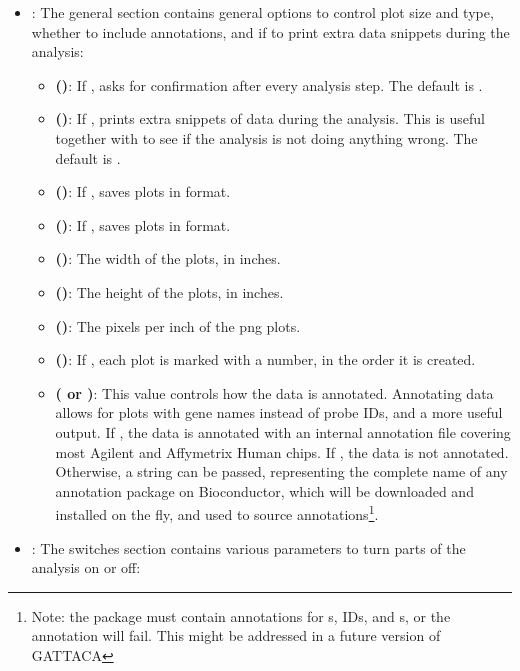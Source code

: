 \begin{itemize}
    \item \textbf{}: The general section contains general options to control plot size and type, whether to include annotations, and if to print extra data snippets during the analysis:
    \begin{itemize}
        \item \textbf{ ()}: If , asks for confirmation after every analysis step. The default is .
        \item \textbf{ ()}: If , prints extra snippets of data during the analysis. This is useful together with  to see if the analysis is not doing anything wrong. The default is .
        \item \textbf{ ()}: If , saves plots in  format.
        \item \textbf{ ()}: If , saves plots in  format.
        \item \textbf{ ()}: The width of the plots, in inches.
        \item \textbf{ ()}: The height of the plots, in inches.
        \item \textbf{ ()}: The pixels per inch of the png plots.
        \item \textbf{ ()}: If , each plot is marked with a number, in the order it is created.
        \item \textbf{ ( or )}: This value controls how the data is annotated. Annotating data allows for plots with gene names instead of probe IDs, and a more useful output. If , the data is annotated with an internal annotation file covering most Agilent and Affymetrix Human chips. If , the data is not annotated. Otherwise, a string can be passed, representing the complete name of any annotation package on Bioconductor, which will be downloaded and installed on the fly, and used to source annotations\footnote{Note: the package must contain annotations for s,  IDs, and s, or the annotation will fail. This might be addressed in a future version of GATTACA}.
    \end{itemize}
    \item \textbf{}: The switches section contains various parameters to turn parts of the analysis on or off:

\end{itemize}
